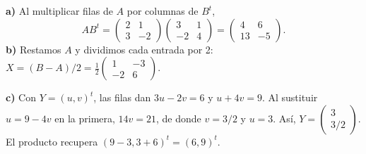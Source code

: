 \textbf{a)} Al multiplicar filas de $A$ por columnas de $B^t$,
\[
AB^t=\begin{pmatrix}2&1\\3&-2\end{pmatrix}
\begin{pmatrix}3&1\\-2&4\end{pmatrix}
=\boxed{\begin{pmatrix}4&6\\13&-5\end{pmatrix}}.
\]
\textbf{b)} Restamos $A$ y dividimos cada entrada por 2:
$X=(B-A)/2=\boxed{\tfrac12\begin{pmatrix}1&-3\\-2&6\end{pmatrix}}$.

\textbf{c)} Con $Y=(u,v)^t$, las filas dan $3u-2v=6$
y $u+4v=9$. Al sustituir $u=9-4v$ en la primera,
$14v=21$, de donde $v=3/2$ y $u=3$.
Así, $Y=\boxed{\begin{pmatrix}3\\3/2\end{pmatrix}}$.
El producto recupera $(9-3,3+6)^t=(6,9)^t$.
